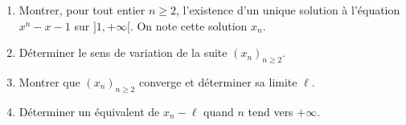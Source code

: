 \documentclass[a4paper,10pt]{report}
\begin{document}
\medskip



\begin{Exa}
\begin{enumerate}
\item Montrer, pour tout entier $n \geq 2$,  l'existence d'un unique solution à l'équation $x^n-x-1$ sur $]1, + \infty[$. On note cette solution $x_n$.
\item Déterminer le sens de variation de la suite $(x_n)_{n \geq 2}$.
\item Montrer que  $(x_n)_{n \geq 2}$ converge et déterminer sa limite $\ell$.
\item Déterminer un équivalent de $x_n- \ell$ quand $n$ tend vers $+ \infty$.
\end{enumerate}
\end{Exa}
\end{document}
